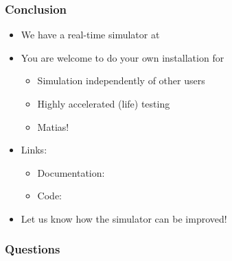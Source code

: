 \documentclass[t]{beamer}
\begin{document}
\begin{frame}
  \frametitle{Conclusion}
  
  \begin{itemize}
    \item We have a real-time simulator at\\
    \item You are welcome to do your own installation for
      \begin{itemize}
        \item Simulation independently of other users
        \item Highly accelerated (life) testing
        \item Matias!
      \end{itemize}
    \item Links:
    \begin{itemize}
      \item Documentation: \\
      \item Code:  \\
    \end{itemize}
    \item Let us know how the simulator can be improved!
  \end{itemize}
  
\end{frame}

\begin{frame}
  \frametitle{Questions}
  
\end{frame}
\end{document}
